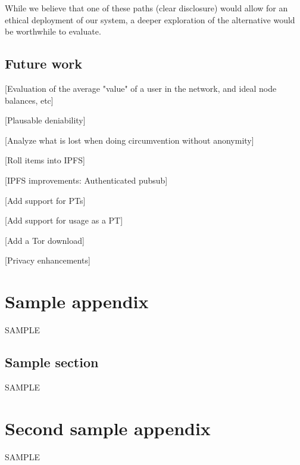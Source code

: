 \documentclass[12pt]{report}
\begin{document}
While we believe that one of these paths (clear disclosure) would allow for an ethical deployment of our system, a deeper exploration of the alternative would be worthwhile to evaluate.

\section{Future work}

[Evaluation of the average "value" of a user in the network, and ideal node balances, etc]

[Plausable deniability]

[Analyze what is lost when doing circumvention without anonymity]

[Roll items into IPFS]

[IPFS improvements: Authenticated pubsub]

[Add support for PTs]

[Add support for usage as a PT]

[Add a Tor download]

[Privacy enhancements]

\appendices  %

\chapter{Sample appendix}
SAMPLE
\section{Sample section}
SAMPLE

\chapter{Second sample appendix}
SAMPLE




\end{document}
